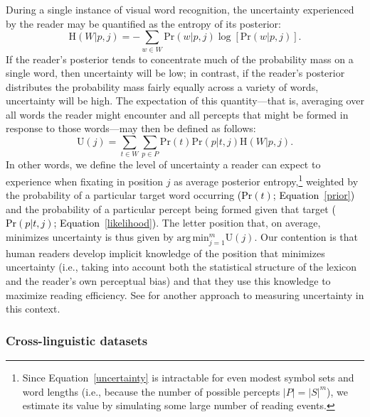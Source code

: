 \documentclass[doc,biblatex]{apa7}
\newcommand\newmaterial[1]{\textcolor{black}{#1}}
\begin{document}
During a single instance of visual word recognition, the uncertainty experienced by the reader may be quantified as the entropy of its posterior:
\begin{equation}
\mathrm{H}(W|p,j) = -\sum_{w \in W} \mathrm{Pr}(w|p,j) \log [\mathrm{Pr}(w|p,j)].
\label{entropy}
\end{equation}
If the reader's posterior tends to concentrate much of the probability mass on a single word, then uncertainty will be low; in contrast, if the reader's posterior distributes the probability mass fairly equally across a variety of words, uncertainty will be high. The expectation of this quantity---that is, averaging over all words the reader might encounter and all percepts that might be formed in response to those words---may then be defined as follows:
\begin{equation}
\mathrm{U}(j) = \sum_{t \in W} \sum_{p \in P} \mathrm{Pr}(t) \mathrm{Pr}(p|t,j) \mathrm{H}(W|p,j).
\label{uncertainty}
\end{equation}
In other words, we define the level of uncertainty a reader can expect to experience when fixating in position $j$ as average posterior entropy,\footnote{Since Equation~\ref{uncertainty} is intractable for even modest symbol sets and word lengths (i.e., because the number of possible percepts $|P| = |S|^m$), we estimate its value by simulating some large number of reading events.} weighted by the probability of a particular target word occurring \newmaterial{($\mathrm{Pr}(t)$; Equation~\ref{prior})} and the probability of a particular percept being formed given that target \newmaterial{($\mathrm{Pr}(p|t,j)$; Equation~\ref{likelihood})}. The letter position that, on average, minimizes uncertainty is thus given by $\mathrm{arg\,min}_{j=1}^m \mathrm{U}(j)$. Our contention is that human readers develop implicit knowledge of the position that minimizes uncertainty (i.e., taking into account both the statistical structure of the lexicon and the reader's own perceptual bias) and that they use this knowledge to maximize reading efficiency. See \textcite{Alhama:2019} for another approach to measuring uncertainty in this context.

\subsubsection{Cross-linguistic datasets}
\end{document}
